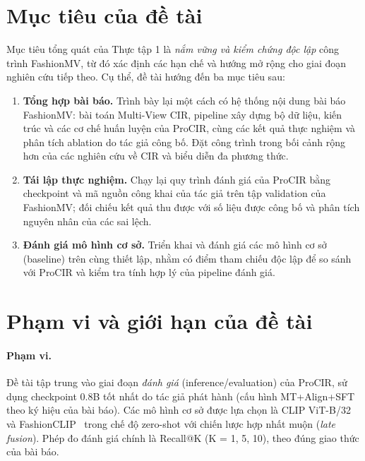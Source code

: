\section{Mục tiêu của đề tài}

Mục tiêu tổng quát của Thực tập 1 là \emph{nắm vững và kiểm chứng độc lập} công trình FashionMV, từ đó xác định các hạn chế và hướng mở rộng cho giai đoạn nghiên cứu tiếp theo. Cụ thể, đề tài hướng đến ba mục tiêu sau:

\begin{enumerate}
    \item \textbf{Tổng hợp bài báo.} Trình bày lại một cách có hệ thống nội dung bài báo FashionMV: bài toán Multi-View CIR, pipeline xây dựng bộ dữ liệu, kiến trúc và các cơ chế huấn luyện của ProCIR, cùng các kết quả thực nghiệm và phân tích ablation do tác giả công bố. Đặt công trình trong bối cảnh rộng hơn của các nghiên cứu về CIR và biểu diễn đa phương thức.
    \item \textbf{Tái lập thực nghiệm.} Chạy lại quy trình đánh giá của ProCIR bằng checkpoint và mã nguồn công khai của tác giả trên tập validation của FashionMV; đối chiếu kết quả thu được với số liệu được công bố và phân tích nguyên nhân của các sai lệch.
    \item \textbf{Đánh giá mô hình cơ sở.} Triển khai và đánh giá các mô hình cơ sở (baseline) trên cùng thiết lập, nhằm có điểm tham chiếu độc lập để so sánh với ProCIR và kiểm tra tính hợp lý của pipeline đánh giá.
\end{enumerate}

\section{Phạm vi và giới hạn của đề tài}

\paragraph{Phạm vi.} Đề tài tập trung vào giai đoạn \emph{đánh giá} (inference/evaluation) của ProCIR, sử dụng checkpoint 0.8B tốt nhất do tác giả phát hành (cấu hình MT+Align+SFT theo ký hiệu của bài báo). Các mô hình cơ sở được lựa chọn là CLIP ViT-B/32~\cite{radford2021clip} và FashionCLIP~\cite{chia2022fashionclip} trong chế độ zero-shot với chiến lược hợp nhất muộn (\emph{late fusion}). Phép đo đánh giá chính là Recall@K (K = 1, 5, 10), theo đúng giao thức của bài báo.

